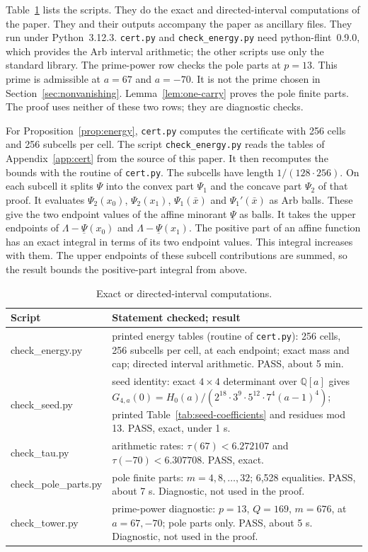 \documentclass{amsart}
\numberwithin{equation}{section}
\numberwithin{table}{section}
\begin{document}
Table~\ref{tab:checks-clean} lists the scripts. They do the exact and
directed-interval computations of the paper. They and
their outputs accompany the paper as ancillary files. They run under Python~3.12.3. \texttt{cert.py} and
\texttt{check\_energy.py} need python-flint~0.9.0, which provides the Arb
interval arithmetic; the other scripts use only the standard library. The
prime-power row checks the pole parts at $p=13$. This prime is admissible
at $a=67$ and $a=-70$. It is not the prime chosen in
Section~\ref{sec:nonvanishing}. Lemma~\ref{lem:one-carry} proves the pole
finite parts. The proof uses neither of these two rows; they are diagnostic
checks.

For Proposition~\ref{prop:energy}, \texttt{cert.py} computes the
certificate with 256 cells and 256 subcells per cell. The script
\texttt{check\_energy.py} reads the tables of Appendix~\ref{app:cert} from
the source of this paper. It then recomputes the bounds with the routine of
\texttt{cert.py}. The subcells have length $1/(128\cdot256)$. On each subcell
it splits $\Psi$ into the convex part $\Psi_1$ and the concave part $\Psi_2$
of that proof. It evaluates $\Psi_2(x_0)$, $\Psi_2(x_1)$, $\Psi_1(\bar x)$ and
$\Psi_1'(\bar x)$ as Arb balls. These give the two endpoint values of the affine minorant
$\underline\Psi$ as balls. It takes the upper endpoints of
$\Lambda-\underline\Psi(x_0)$ and $\Lambda-\underline\Psi(x_1)$. The
positive part of an affine function has an exact integral in terms of its
two endpoint values. This integral increases with them. The upper endpoints of
these subcell contributions are summed, so the result bounds the
positive-part integral from above.

\begin{table}[!ht]
\caption{Exact or directed-interval computations.}\label{tab:checks-clean}
\small
\renewcommand{\arraystretch}{1.15}
\begin{tabular}{@{}>{\footnotesize\ttfamily}l>{\raggedright\arraybackslash}p{}@{}}
\normalfont\small Script & Statement checked; result\\ \hline
check\_energy.py & printed energy tables (routine of \texttt{cert.py}): 256 cells, 256 subcells per cell, at each endpoint; exact mass and cap; directed interval arithmetic. PASS, about 5 min.\\
check\_seed.py & seed identity: exact $4\times4$ determinant over $\mathbb Q[a]$ gives $G_{4,a}(0)=H_0(a)/(2^{18}\cdot3^{9}\cdot5^{12}\cdot7^{4}(a-1)^4)$; printed Table~\ref{tab:seed-coefficients} and residues mod 13. PASS, exact, under 1 s.\\
check\_tau.py & arithmetic rates: $\tau(67)<6.272107$ and $\tau(-70)<6.307708$. PASS, exact.\\
check\_pole\_parts.py & pole finite parts: $m=4,8,\ldots,32$; 6,528 equalities. PASS, about 7 s. Diagnostic, not used in the proof.\\
check\_tower.py & prime-power diagnostic: $p=13$, $Q=169$, $m=676$, at $a=67,-70$; pole parts only. PASS, about 5 s. Diagnostic, not used in the proof.
\end{tabular}
\end{table}
\end{document}
